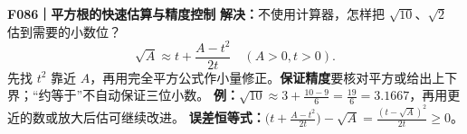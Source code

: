 \textbf{F086｜平方根的快速估算与精度控制}
\textbf{解决：}不使用计算器，怎样把 $\sqrt{10}$、$\sqrt2$ 估到需要的小数位？
\[\boxed{\sqrt A\approx t+\frac{A-t^2}{2t}}\quad(A>0,t>0).\]
先找 $t^2$ 靠近 $A$，再用完全平方公式作小量修正。\textbf{保证精度}要核对平方或给出上下界；“约等于”不自动保证三位小数。
\textbf{例：}$\sqrt{10}\approx3+\frac{10-9}{6}=\frac{19}{6}=3.1667$，再用更近的数或放大后估可继续改进。
\textbf{误差恒等式：}$\bigl(t+\frac{A-t^2}{2t}\bigr)-\sqrt A=\frac{(t-\sqrt A)^2}{2t}\ge0$。
